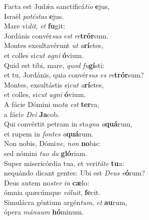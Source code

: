 \evenverse Facta est Judǽa sanctificá\textit{ti}\textit{o} \textbf{e}jus,~\*\\
\evenverse Israël \textit{po}\textit{té}\textit{stas} \textbf{e}jus.\\
\oddverse Mare vi\textit{dit}, \textit{et} \textbf{fu}git:~\*\\
\oddverse Jordánis convér\textit{sus} \textit{est} \textit{re}\textbf{trór}sum.\\
\evenverse Montes exsultavérunt \textit{ut} \textit{a}\textbf{rí}etes,~\*\\
\evenverse et colles si\textit{cut} \textit{a}\textit{gni} \textbf{ó}vium.\\
\oddverse Quid est tibi, mare, \textit{quod} \textit{fu}\textbf{gí}sti:~\*\\
\oddverse et tu, Jordánis, quia convér\textit{sus} \textit{es} \textit{re}\textbf{trór}sum?\\
\evenverse Montes, exsultástis si\textit{cut} \textit{a}\textbf{rí}etes,~\*\\
\evenverse et colles, si\textit{cut} \textit{a}\textit{gni} \textbf{ó}vium.\\
\oddverse A fácie Dómini mo\textit{ta} \textit{est} \textbf{ter}ra,~\*\\
\oddverse a fáci\textit{e} \textit{De}\textit{i} \textbf{Ja}cob.\\
\evenverse Qui convértit petram in sta\textit{gna} \textit{a}\textbf{quá}rum,~\*\\
\evenverse et rupem in \textit{fon}\textit{tes} \textit{a}\textbf{quá}rum.\\
\oddverse Non nobis, Dómi\textit{ne}, \textit{non} \textbf{no}bis:~\*\\
\oddverse sed nómini \textit{tu}\textit{o} \textit{da} \textbf{gló}riam.\\
\evenverse Super misericórdia tua, et veri\textit{tá}\textit{te} \textbf{tu}a:~\*\\
\evenverse nequándo dicant gentes: Ubi est \textit{De}\textit{us} \textit{e}\textbf{ó}rum?\\
\oddverse Deus autem no\textit{ster} \textit{in} \textbf{cæ}lo:~\*\\
\oddverse ómnia quæcúmque \textit{vó}\textit{lu}\textit{it}, \textbf{fe}cit.\\
\evenverse Simulácra géntium argén\textit{tum}, \textit{et} \textbf{au}rum,~\*\\
\evenverse ópera \textit{má}\textit{nu}\textit{um} \textbf{hó}minum.\\
